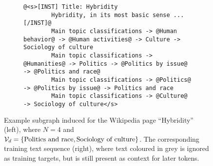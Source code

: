 \begin{figure}[t]
    \centering
    \begin{subfigure}[c]{0.443\textwidth}
        \centering
    \end{subfigure}%
    \hfill
    \begin{adjustbox}{varwidth=\linewidth,fbox}
        \begin{subfigure}[c]{0.48\textwidth}
            \centering
            \begin{lstlisting}[gobble=8,style=prompt]
        @<s>[INST] Title: Hybridity
        Hybridity, in its most basic sense ... [/INST]@
        Main topic classifications -> @Human behavior@ -> @Human activities@ -> Culture -> Sociology of culture
        Main topic classifications -> @Humanities@ -> Politics -> @Politics by issue@ -> @Politics and race@
        Main topic classifications -> @Politics@ -> @Politics by issue@ -> Politics and race
        Main topic classifications -> @Culture@ -> Sociology of culture</s>
        \end{lstlisting}
        \end{subfigure}
    \end{adjustbox}
    \caption{Example subgraph induced for the Wikipedia page ``Hybridity'' (left), where $N = 4$ and $\mathcal{V}_d = \{\text{Politics and race}, \text{Sociology of culture}\}$.
        The corresponding training text sequence (right), where text coloured in grey is ignored as training targets, but is still present as context for later tokens.}
    \label{fig:prompt-example}
\end{figure}